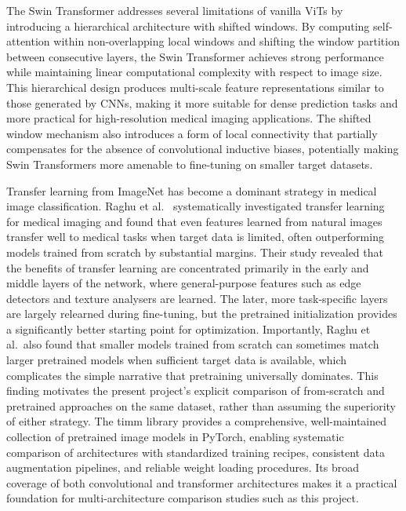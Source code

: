 \documentclass[justified,notoc,openany]{tufte-book}
\begin{document}
The Swin Transformer \cite{Liu2021} addresses several limitations of vanilla ViTs by introducing a hierarchical architecture with shifted windows. By computing self-attention within non-overlapping local windows and shifting the window partition between consecutive layers, the Swin Transformer achieves strong performance while maintaining linear computational complexity with respect to image size. This hierarchical design produces multi-scale feature representations similar to those generated by CNNs, making it more suitable for dense prediction tasks and more practical for high-resolution medical imaging applications. The shifted window mechanism also introduces a form of local connectivity that partially compensates for the absence of convolutional inductive biases, potentially making Swin Transformers more amenable to fine-tuning on smaller target datasets.

Transfer learning from ImageNet has become a dominant strategy in medical image classification. Raghu et al.~\cite{Raghu2019} systematically investigated transfer learning for medical imaging and found that even features learned from natural images transfer well to medical tasks when target data is limited, often outperforming models trained from scratch by substantial margins. Their study revealed that the benefits of transfer learning are concentrated primarily in the early and middle layers of the network, where general-purpose features such as edge detectors and texture analysers are learned. The later, more task-specific layers are largely relearned during fine-tuning, but the pretrained initialization provides a significantly better starting point for optimization. Importantly, Raghu et al.~also found that smaller models trained from scratch can sometimes match larger pretrained models when sufficient target data is available, which complicates the simple narrative that pretraining universally dominates. This finding motivates the present project's explicit comparison of from-scratch and pretrained approaches on the same dataset, rather than assuming the superiority of either strategy. The timm library \cite{Wightman2019} provides a comprehensive, well-maintained collection of pretrained image models in PyTorch, enabling systematic comparison of architectures with standardized training recipes, consistent data augmentation pipelines, and reliable weight loading procedures. Its broad coverage of both convolutional and transformer architectures makes it a practical foundation for multi-architecture comparison studies such as this project.
\end{document}
